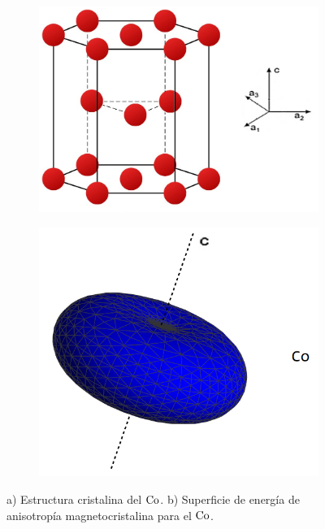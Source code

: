 \begin{figure}[!hpt]
    \centering
    \begin{subfigure}[b]{0.45\textwidth}
        \includegraphics[scale=0.20]{Figuras/Crystal-hcp.png}
        \caption{}
        \label{fig:hcp}
    \end{subfigure}
    \begin{subfigure}[b]{0.35\textwidth}
        \includegraphics[scale=0.35]{Figuras/MagnetocrystallineCo.png}
        \caption{}
        \label{fig:anisotropyhcp}
    \end{subfigure}
    \renewcommand{\figurename}{\textbf{Figura}}
    \renewcommand\thefigure{\textbf{\arabic{figure}}}
    \caption{a) Estructura cristalina del $\ce{Co}$. b) Superficie de energía de anisotropía magnetocristalina para el $\ce{Co}$.}
    \label{fig:uniaxialhcp}
\end{figure}

